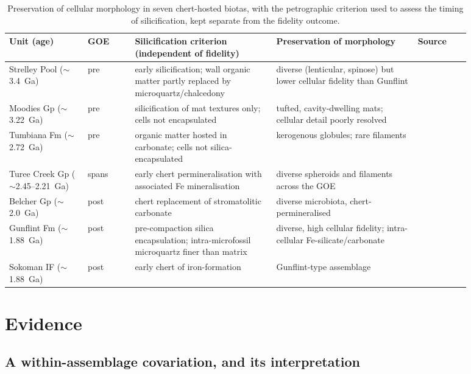 \documentclass[11pt]{article}
\begin{document}
\begin{table}[t]
\centering\small
\caption{Preservation of cellular morphology in seven chert-hosted biotas, with the petrographic
criterion used to assess the timing of silicification, kept separate from the fidelity outcome.}
\label{tab:panel}
\begin{tabular}{p{0.15\linewidth}p{0.09\linewidth}p{0.27\linewidth}p{0.27\linewidth}p{0.10\linewidth}}
\toprule
Unit (age) & GOE & Silicification criterion (independent of fidelity) & Preservation of morphology & Source \\
\midrule
Strelley Pool ($\sim$3.4~Ga) & pre & early silicification; wall organic matter partly replaced by microquartz/chalcedony & diverse (lenticular, spinose) but lower cellular fidelity than Gunflint & \citep{Sugitani2010,Delarue2020,Wacey2012} \\
Moodies Gp ($\sim$3.22~Ga) & pre & silicification of mat textures only; cells not encapsulated & tufted, cavity-dwelling mats; cellular detail poorly resolved & \citep{Homann2015} \\
Tumbiana Fm ($\sim$2.72~Ga) & pre & organic matter hosted in carbonate; cells not silica-encapsulated & kerogenous globules; rare filaments & \citep{Lepot2009,Decraene2021} \\
Turee Creek Gp ($\sim$2.45--2.21~Ga) & spans & early chert permineralisation with associated Fe mineralisation & diverse spheroids and filaments across the GOE & \citep{Lepot2017b,Barlow2018} \\
\midrule
Belcher Gp ($\sim$2.0~Ga) & post & chert replacement of stromatolitic carbonate & diverse microbiota, chert-permineralised & \citep{Javaux2018} \\
Gunflint Fm ($\sim$1.88~Ga) & post & pre-compaction silica encapsulation; intra-microfossil microquartz finer than matrix & diverse, high cellular fidelity; intra-cellular Fe-silicate/carbonate & \citep{Lepot2017a,Wacey2013,Alleon2016} \\
Sokoman IF ($\sim$1.88~Ga) & post & early chert of iron-formation & Gunflint-type assemblage & \citep{Javaux2018} \\
\bottomrule
\end{tabular}
\end{table}

\section{Evidence}

\subsection{A within-assemblage covariation, and its interpretation}
\end{document}
